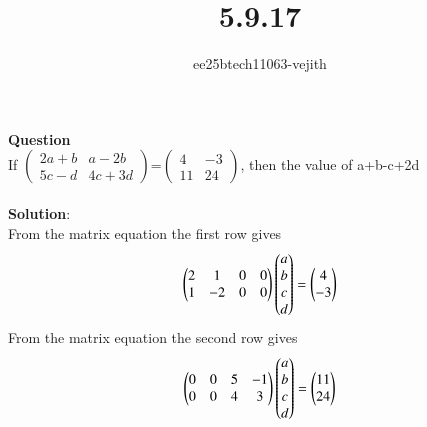 \documentclass[journal]{IEEEtran}
\begin{document}

\vspace{3cm}

\title{5.9.17}
\author{ee25btech11063-vejith}

\maketitle
{\let\newpage\relax\maketitle}
\renewcommand{\thefigure}{\theenumi}
\renewcommand{\thetable}{\theenumi}
\setlength{\intextsep}{10pt} %
\textbf{Question}\\
If   $\begin{pmatrix}
    2a+b & a-2b\\
    5c-d & 4c+3d
\end{pmatrix}$=$\begin{pmatrix}
    4 & -3\\
    11 & 24
\end{pmatrix}$, then the value of a+b-c+2d\\ \\
\textbf{Solution}:\\
From the matrix equation the first row gives
\begin{align}
    \begin{pmatrix}
        2 & 1 & 0 & 0\\
        1 & -2 & 0 & 0
        \end{pmatrix} \begin{pmatrix}a\\b\\c\\d\end{pmatrix}=\begin{pmatrix}4\\-3\end{pmatrix}
    \end{align}
    From the matrix equation the second row gives
    \begin{align}
    \begin{pmatrix}
        0 & 0 & 5 & -1\\
        0 & 0 & 4 & 3
        \end{pmatrix} \begin{pmatrix}a\\b\\c\\d\end{pmatrix}=\begin{pmatrix}11\\24\end{pmatrix}
    \end{align}
\end{document}
